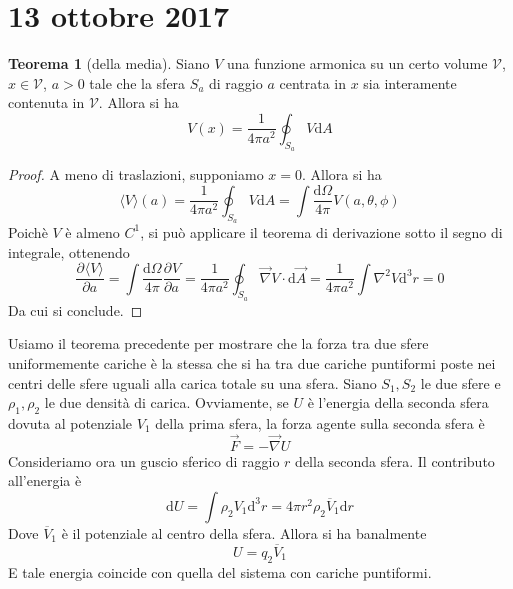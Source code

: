 \documentclass[a4paper,11pt]{book}
\let\oldnabla\nabla
\renewcommand{\nabla}{\vec{\oldnabla}}
\newcommand{\der}[3][]{\frac{\partial ^{#1}#2}{\partial #3^{#1}}}
\newcommand{\dif}{\mathrm{d}}
\newcommand{\lap}{\oldnabla^2}
\newcommand{\V}{\mathcal{V}}
\theoremstyle{definition}
\theoremstyle{theorem}
\newtheorem{teorema}{Teorema}[section]
\begin{document}
\section{13 ottobre 2017}
\begin{teorema}[della media]
	Siano $V$ una funzione armonica su un certo volume $\V$, $x\in \V$, $a>0$ tale che la sfera $S_a$ di raggio $a$ centrata in $x$ sia interamente contenuta in $\V$. Allora si ha
	\[
	V(x)=\frac{1}{4\pi a^2}\oint_{S_a}V\dif A
	\]
\end{teorema} 
\begin{proof}
	A meno di traslazioni, supponiamo $x=0$. Allora si ha
	\[
	\langle V\rangle(a)=\frac{1}{4\pi a^2}\oint_{S_a}V\dif A=\int\frac{\dif\Omega}{4\pi}V(a,\theta,\phi)
	\]
	Poichè $V$ è almeno $C^1$, si può applicare il teorema di derivazione sotto il segno di integrale, ottenendo
	\[\der{\langle V\rangle}{a}=\int\frac{\dif\Omega}{4\pi}\der{V}{a}=\frac{1}{4\pi a^2}\oint_{S_a}\nabla V\cdot\dif\vec{A}=\frac{1}{4\pi a^2}\int\lap V\dif^3r=0\]
	Da cui si conclude.
\end{proof}
Usiamo il teorema precedente per mostrare che la forza tra due sfere uniformemente cariche è la stessa che si ha tra due cariche puntiformi poste nei centri delle sfere uguali alla carica totale su una sfera. Siano $S_1,S_2$ le due sfere e $\rho_1,\rho_2$ le due densità di carica. Ovviamente, se $U$ è l'energia della seconda sfera dovuta al potenziale $V_1$ della prima sfera, la forza agente sulla seconda sfera è
\[\vec{F}=-\nabla U\]
Consideriamo ora un guscio sferico di raggio $r$ della seconda sfera. Il contributo all'energia è
\[\dif U=\int\rho_2V_1\dif^3r=4\pi r^2\rho_2\overline{V}_1\dif r\]
Dove $\overline{V}_1$ è il potenziale al centro della sfera. Allora si ha banalmente
\[U=q_2\overline{V}_1\]
E tale energia coincide con quella del sistema con cariche puntiformi.
\end{document}
